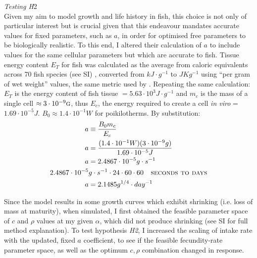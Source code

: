 \documentclass[a4paper]{article} %
\begin{document}
\textit{Testing H}2 \\
Given my aim to model growth and life history in fish, this choice is not only of particular interest but is crucial given that this endeavour mandates accurate values for fixed parameters, such as $a$, in order for optimised free parameters to be biologically realistic. To this end, I altered their calculation of $a$ to include values for the same cellular parameters but which are accurate to fish. Tissue energy content $E_T$ for fish was calculated as the average from caloric equivalents across 70 fish species (see SI) \autocite{Cummins1971, Steimle1980, Hartman1995}, converted from $kJ\cdot g^{-1}$ to $JKg^{-1}$ using ``per gram of wet weight'' values, the same metric used by \cite{West2001}. Repeating the same calculation: $E_T$ is the energy content of fish tissue $= 5.63 \cdot 10^3 J\cdot g^{-1}$ and $m_c$ is the mass of a single cell $\approx 3 \cdot 10^{-9} \textsc{g}$, thus $E_c$, the energy required to create a cell \textit{in viro} = $1.69 \cdot 10^{-5} J$. $B_0 \approx 1.4 \cdot 10^{-1} W$ for poikilotherms. By substitution:
\begin{align*}
    a &\equiv \frac{B_{0}m_{c}}{E_{c}} \\
    a &= \frac{(1.4 \cdot 10^{-1} W)(3 \cdot 10^{-9} g)}{1.69 \cdot 10^{-5} J}\\
    a &= 2.4867 \cdot 10^{-5}g\cdot s^{-1} \\
    2.4867 \cdot 10^{-5}&g\cdot s^{-1} \cdot 24 \cdot 60 \cdot 60 \ \ \textsc{   seconds to days}\\
    a &= 2.1485 g^{1/4}\cdot day^{-1}
\end{align*}

Since the model results in some growth curves which exhibit shrinking (i.e. loss of mass at maturity), when simulated, I first obtained the feasible parameter space of $c$ and $\rho$ values at my given $\alpha$, which did not produce shrinking (see SI for full method explanation). To test hypothesis \textit{H2}, I increased the scaling of intake rate with the updated, fixed $a$ coefficient, to see if the feasible fecundity-rate parameter space, as well as the optimum $c, \rho$ combination changed in response.
\end{document}
